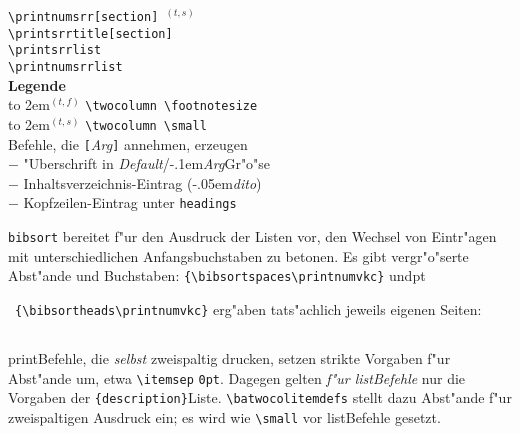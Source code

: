 \documentclass[12pt,a4paper]{article}
\newcommand{\pdfko}[1]{\kern #1pt
                          \strut\ignorespaces}%
\begin{document}
\verb|\printnumsrr[section]|~$^{(t, s)}$ \\[0.5ex]
\verb|\printsrrtitle[section]| \\
\verb|\printsrrlist| \\
\verb|\printnumsrrlist|\\[1.75ex]
\textbf{Legende} \\[0.25ex]
{\footnotesize
\hbox to 2em{$^{(t, f)}$\hfill} \verb|\twocolumn \footnotesize| \\[-.5ex]
\hbox to 2em{$^{(t, s)}$\hfill} \verb|\twocolumn \small| \\[-.25ex]
Befehle, die \verb|[|\textit{Arg}\verb|]| annehmen, erzeugen \\[-.5ex]
$-$ "Uberschrift in \textit{Default}\fhy/\kern-.1em\textit{Arg}\fhy Gr"o"se \\[-.65ex]
$-$ Inhaltsverzeichnis-Eintrag (\kern-.05em\textit{dito}) \\[-.65ex]
$-$ Kopfzeilen-Eintrag unter \texttt{headings}}
\onecolumn


\newpage\noindent
\verb|bibsort| bereitet f"ur den Ausdruck der Listen vor, 
den Wechsel von Eintr"agen mit unterschiedlichen Anfangsbuchstaben zu betonen.
Es gibt vergr"o"serte Abst"ande und Buchstaben: 
\verb|{\bibsortspaces\printnumvkc}| und\pdfko{1.5}\ 
\verb|{\bibsortheads\printnumvkc}| erg"aben tats"achlich jeweils eigenen Seiten:

\vspace{-1ex}\noindent\hspace{1em}%
\parbox[t]{.45\textwidth}
{\subsection*{\gvkctitlename}\vspace{\batwocoltopskip}\bibsortspaces\batwocolitemdefs\small\printnumvkclist}
\hspace{.5em}%
{\makeatletter\def\@baitemdefs{\parsep 0pt \itemsep 0pt \parskip 0pt \lineskip 0pt \rightskip 1cm minus 1cm}\makeatother
\parbox[t]{.45\textwidth}
{\subsection*{\gvkctitlename}\vspace{\batwocoltopskip}\bibsortheads\small\printnumvkclist}}%
\label{head}%

\vfill\noindent
print\hy Befehle, die \textit{selbst} zweispaltig drucken,
setzen strikte Vorgaben f"ur Abst"ande um, etwa 
\verb|\itemsep| \verb|0pt|. Dagegen gelten \textit{f"ur list\hy Befehle}
nur die Vorgaben der \verb|{description}|\hy Liste.
\verb|\batwocolitemdefs| stellt dazu Abst"ande f"ur zweispaltigen Ausdruck 
ein; es wird wie \verb|\small| vor list\hy Befehle gesetzt.
\end{document}
